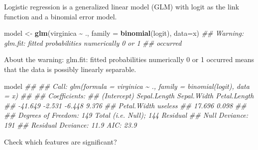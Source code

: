 \documentclass[
  notitlepage]{book}
\newenvironment{Shaded}{\begin{snugshade}}{\end{snugshade}}
\newcommand{\CommentTok}[1]{\textcolor[rgb]{0.56,0.35,0.01}{\textit{#1}}}
\newcommand{\DataTypeTok}[1]{\textcolor[rgb]{0.13,0.29,0.53}{#1}}
\newcommand{\KeywordTok}[1]{\textcolor[rgb]{0.13,0.29,0.53}{\textbf{#1}}}
\newcommand{\NormalTok}[1]{#1}
\newcommand{\OperatorTok}[1]{\textcolor[rgb]{0.81,0.36,0.00}{\textbf{#1}}}
\newcommand{\StringTok}[1]{\textcolor[rgb]{0.31,0.60,0.02}{#1}}
\begin{document}
Logistic regression is a generalized linear model (GLM) with logit as the
link function and a binomial error model.

\begin{Shaded}
\begin{Highlighting}[]
\NormalTok{model \textless{}{-}}\StringTok{ }\KeywordTok{glm}\NormalTok{(virginica }\OperatorTok{\textasciitilde{}}\StringTok{ }\NormalTok{.,}
  \DataTypeTok{family =} \KeywordTok{binomial}\NormalTok{(logit), }\DataTypeTok{data=}\NormalTok{x)}
\CommentTok{\#\# Warning: glm.fit: fitted probabilities numerically 0 or 1}
\CommentTok{\#\# occurred}
\end{Highlighting}
\end{Shaded}

About the warning: glm.fit: fitted probabilities numerically 0 or 1 occurred means that the data is possibly linearly separable.

\begin{Shaded}
\begin{Highlighting}[]
\NormalTok{model}
\CommentTok{\#\# }
\CommentTok{\#\# Call:  glm(formula = virginica \textasciitilde{} ., family = binomial(logit), data = x)}
\CommentTok{\#\# }
\CommentTok{\#\# Coefficients:}
\CommentTok{\#\#  (Intercept)  Sepal.Length   Sepal.Width  Petal.Length  }
\CommentTok{\#\#      {-}41.649        {-}2.531        {-}6.448         9.376  }
\CommentTok{\#\#  Petal.Width       useless  }
\CommentTok{\#\#       17.696         0.098  }
\CommentTok{\#\# }
\CommentTok{\#\# Degrees of Freedom: 149 Total (i.e. Null);  144 Residual}
\CommentTok{\#\# Null Deviance:       191 }
\CommentTok{\#\# Residual Deviance: 11.9  AIC: 23.9}
\end{Highlighting}
\end{Shaded}

Check which features are significant?
\end{document}
